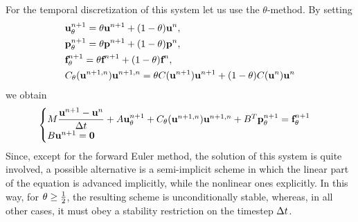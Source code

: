 For the temporal discretization of this system let us use the \(\theta\)-method. By setting
\begin{align*}
    &\textbf{u}_\theta^{n+1} = \theta \textbf{u}^{n+1} + (1-\theta)\textbf{u}^n, \\
    &\textbf{p}_\theta^{n+1} = \theta \textbf{p}^{n+1} + (1-\theta)\textbf{p}^n, \\
    &\textbf{f}_\theta^{n+1} = \theta \textbf{f}^{n+1} + (1-\theta)\textbf{f}^n, \\
    &C_\theta(\textbf{u}^{n+1,n})\textbf{u}^{n+1,n} = \theta C(\textbf{u}^{n+1})\textbf{u}^{n+1} + (1-\theta)C(\textbf{u}^{n})\textbf{u}^{n}
\end{align*}
we obtain 
\begin{equation}
    \begin{cases}
        M\dfrac{\textbf{u}^{n+1}-\textbf{u}^n}{\Delta t} + A\textbf{u}_\theta^{n+1} + C_\theta(\textbf{u}^{n+1,n})\textbf{u}^{n+1,n} + B^T\textbf{p}_\theta^{n+1} = \textbf{f}_\theta^{n+1} \\
        B\textbf{u}^{n+1} = \textbf{0}
    \end{cases}
    \label{59_slide_ns}
\end{equation}
Since, except for the forward Euler method, the solution of this system is quite involved, a possible alternative is a semi-implicit scheme in which the linear part of the equation is advanced implicitly, while the nonlinear ones explicitly. In this way, for \(\theta \geq \frac{1}{2}\), the resulting scheme is unconditionally stable, whereas, in all other cases, it must obey a stability restriction on the timestep \(\Delta t\). 
